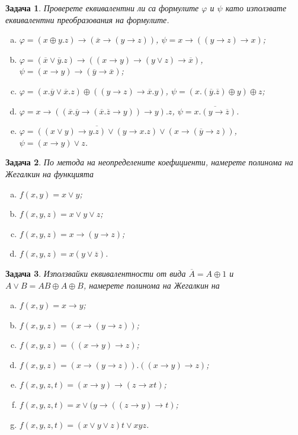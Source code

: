 \documentclass[a4paper]{article}
\newtheorem{problem}{Задача}
\newcommand{\ov}[1]{\overline{#1}}
\begin{document}
\begin{problem} %
  Проверете еквивалентни ли са формулите $\varphi$ и $\psi$ като използвате еквивалентни преобразования на формулите.
  \begin{enumerate}[a)]
  \item
    $\varphi = (x\oplus y.z)\rightarrow (\overline{x}\rightarrow (y\rightarrow z))$,
    $\psi = x\rightarrow ((y\rightarrow z)\rightarrow x)$;
  \item
    $\varphi = (\overline{x}\vee \overline{y}.z)\rightarrow ((x\rightarrow y)\rightarrow (y\vee z)\rightarrow\overline{x})$,
    $\psi = (x\rightarrow y)\rightarrow(\overline{y}\rightarrow\overline{x})$;
  \item
    $\varphi = (x.\overline{y}\vee \overline{x}.z)\oplus ((y\rightarrow z)\rightarrow \overline{x}.y)$,
    $\psi = (x.(\overline{y}.\overline{z})\oplus y)\oplus z$;
  \item
    $\varphi = x\rightarrow ((\ov{x}.\ov{y}\rightarrow(\ov{x}.\ov{z}\rightarrow y))\rightarrow y).z$,
    $\psi = \ov{x.(y\rightarrow\ov{z})}$.
  \item
    $\varphi = \ov{((x\vee y) \rightarrow y.z)\vee (y\rightarrow x.z)} \vee (x\rightarrow (\ov{y}\rightarrow z))$,
    $\psi = (x\rightarrow y)\vee z$.
  \end{enumerate}
\end{problem}

\begin{problem}
  По метода на неопределените коефициенти, намерете полинома на Жегалкин на функцията 
  \begin{enumerate}[a)]
  \item
    $f(x,y) = x\vee y$;
  \item
    $f(x,y,z) = x\vee y \vee z$;
  \item
    $f(x,y,z) = x\rightarrow (y \rightarrow z)$;
  \item
    $f(x,y,z) = x(y\vee\overline{z})$.
  \end{enumerate}
\end{problem}

\begin{problem}
  Използвайки еквивалентности от вида $\overline{A} = A\oplus 1$ и $A\vee B = AB\oplus A\oplus B$, 
  намерете полинома на Жегалкин на 
  \begin{enumerate}[a)]
  \item
    $f(x,y) = x\rightarrow y$;
  \item
    $f(x,y,z) = (x\rightarrow (y\rightarrow z))$;
  \item
    $f(x,y,z) = ((x\rightarrow y)\rightarrow z)$;
  \item
    $f(x,y,z) = (x\rightarrow (y\rightarrow z)).((x\rightarrow y)\rightarrow z)$;
  \item
    $f(x,y,z,t) = (x\rightarrow y)\rightarrow (z\rightarrow xt)$;
  \item
    $f(x,y,z,t) = x\vee (y\rightarrow ((z\rightarrow y)\rightarrow t)$;
  \item
    $f(x,y,z,t) = (x\vee y\vee z)t \vee xyz$.
  \end{enumerate}
\end{problem}
\end{document}
